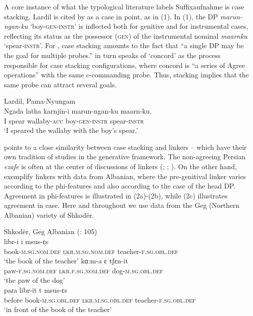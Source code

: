 \documentclass[output=paper]{langsci/langscibook}
\begin{document}
A core instance of what the typological literature labels Suffixaufnahme \citep{Plank1995} is case stacking. Lardil is cited by \citet{Richards2013} as a case in point, as in (1). In (1), the DP \textit{marun-ngan-ku} ‘boy-\textsc{gen-instr}’ is inflected both for genitive and for instrumental cases, reflecting its status as the possessor (\textsc{gen}) of the instrumental nominal \textit{maarnku} ‘spear-\textsc{instr}’. For \citet[62]{Merchant2006}, case stacking amounts to the fact that “a single DP may be the goal for multiple probes.” \citet{Richards2013} in turn speaks of ‘concord’ as the process responsible for case stacking configurations, where concord is “a series of Agree operations” with the same c-commanding probe. Thus, stacking implies that the same probe can attract several goals.

\ea%
Lardil, Pama-Nyungam \citep[43]{Richards2013}\\
\gll  Ngada latha   karnjin-i   marun-ngan-ku   maarn-ku.\\
I   spear   wallaby-\textsc{acc} boy-\textsc{gen-instr}  spear-\textsc{instr}\\
\glt ‘I speared the wallaby with the boy’s spear.’        
\z

\citet{Plank1995} points to a close similarity between case stacking and linkers – which have their own tradition of studies in the generative framework. The non-agreeing Persian \textit{ezafe} is often at the center of discussions of linkers (\citealt{Dikken2004}; \citealt{Larson2008}; \citealt{Richards2010}). On the other hand, \citet{Franco2015} exemplify linkers with data from Albanian, where the pre-genitival linker varies according to the phi-features and also according to the case of the head DP. Agreement in phi-features is illustrated in (2a)-(2b), while (2c) illustrates agreement in case. Here and throughout we use data from the Geg (Northern Albanian) variety of Shkodër.

\ea%
    Shkodër, Geg Albanian  (\citealt{Manzini2011Reducing}: 105)\label{ex:manzini:2}\\
    \ea
    \gll libr-i          i       msus-ɛs   \\
            book-\textsc{m.sg.nom.def}  \textsc{lkr.m.sg.nom.def}   teacher-\textsc{f.sg.obl.def} \\
    \glt    ‘the book of the teacher’
    \ex
    \gll kɑ:m-a      ɛ          tʃɛn-it                \\
         paw-\textsc{f.sg.nom.def}   \textsc{lkr.f.sg.nom.def}  dog-\textsc{m.sg.obl.def}  \\
    \glt ‘the paw of the dog’\\
    \ex
    \gll paɾa     libr-it       t       msus-ɛs\\
         before   book-\textsc{m.sg.obl.def}  \textsc{lkr.m.sg.obl.def}  teacher-\textsc{f.sg.obl.def}\\
    \glt ‘in front of the book of the teacher’ 
    \z
\z 
\end{document}

